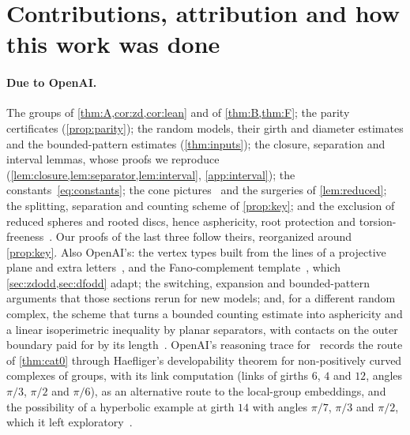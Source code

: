 \documentclass[11pt]{article}
\theoremstyle{definition}
\theoremstyle{plain}
\begin{document}
\section{Contributions, attribution and how this work was done}\label{sec:attribution}

\paragraph{Due to OpenAI.} The groups of \cref{thm:A,cor:zd,cor:lean} and of \cref{thm:B,thm:F}; the parity certificates (\cref{prop:parity}); the random models, their girth and diameter estimates and the bounded-pattern estimates (\cref{thm:inputs}); the closure, separation and interval lemmas, whose proofs we reproduce (\cref{lem:closure,lem:separator,lem:interval}, \cref{app:interval}); the constants~\eqref{eq:constants}; the cone pictures~\cite[Lemma~5.2]{OAI196} and the surgeries of \cref{lem:reduced}; the splitting, separation and counting scheme of \cref{prop:key}; and the exclusion of reduced spheres and rooted discs, hence asphericity, root protection and torsion-freeness~\cite{OAI196,OAI197a,OAI197b}. Our proofs of the last three follow theirs, reorganized around \cref{prop:key}. Also OpenAI's: the vertex types built from the lines of a projective plane and extra letters~\cite[\S2.1]{OAI196}, and the Fano-complement template~\cite[\S3.1]{OAI197a}, which \cref{sec:zdodd,sec:dfodd} adapt; the switching, expansion and bounded-pattern arguments that those sections rerun for new models; and, for a different random complex, the scheme that turns a bounded counting estimate into asphericity and a linear isoperimetric inequality by planar separators, with contacts on the outer boundary paid for by its length~\cite[Thm.~3.1 and Lemma~3.8]{OAI257}. OpenAI's reasoning trace for~\cite{OAI197b} records the route of \cref{thm:cat0} through Haefliger's developability theorem for non-positively curved complexes of groups, with its link computation (links of girths $6$, $4$ and $12$, angles $\pi/3$, $\pi/2$ and $\pi/6$), as an alternative route to the local-group embeddings, and the possibility of a hyperbolic example at girth $14$ with angles $\pi/7$, $\pi/3$ and $\pi/2$, which it left exploratory~\cite[\S\S12, 17 and~21]{OAItrace}.
\end{document}
